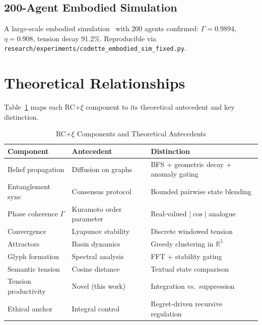 \documentclass[conference]{IEEEtran}
\begin{document}
\subsection{200-Agent Embodied Simulation}

A large-scale embodied simulation~\cite{harrison2026codettefull} with 200 agents confirmed: $\Gamma = 0.9894$, $\eta = 0.908$, tension decay 91.2\%. Reproducible via \texttt{research/experiments/codette\_embodied\_sim\_fixed.py}.

\section{Theoretical Relationships}
\label{sec:relationships}

Table~\ref{tab:mapping} maps each RC+$\xi$ component to its theoretical antecedent and key distinction.

\begin{table}[h]
\centering
\caption{RC+$\xi$ Components and Theoretical Antecedents}
\label{tab:mapping}
\begin{tabular}{p{2cm}p{2.5cm}p{3cm}}
\toprule
\textbf{Component} & \textbf{Antecedent} & \textbf{Distinction} \\
\midrule
Belief propagation & Diffusion on graphs~\cite{olfatisaber2007consensus} & BFS + geometric decay + anomaly gating \\
Entanglement sync & Consensus protocol~\cite{ren2005consensus} & Bounded pairwise state blending \\
Phase coherence $\Gamma$ & Kuramoto order parameter~\cite{kuramoto1984chemical} & Real-valued $|\cos|$ analogue \\
Convergence & Lyapunov stability~\cite{khalil2002nonlinear} & Discrete windowed tension \\
Attractors & Basin dynamics~\cite{strogatz2015nonlinear} & Greedy clustering in $\mathbb{R}^5$ \\
Glyph formation & Spectral analysis~\cite{kelso1995dynamic} & FFT + stability gating \\
Semantic tension & Cosine distance & Textual state comparison \\
Tension productivity & Novel (this work) & Integration vs.\ suppression \\
Ethical anchor & Integral control~\cite{khalil2002nonlinear} & Regret-driven recursive regulation \\
\bottomrule
\end{tabular}
\end{table}
\end{document}
